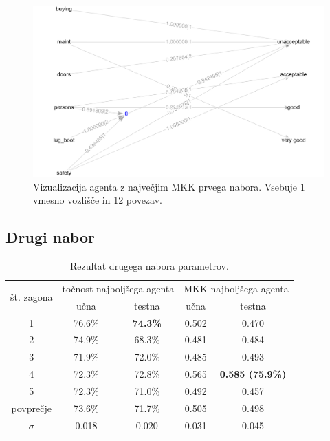 \begin{figure}[H]
    \begin{center}
        \includegraphics[width=13cm]{car/1/mcc_g}
    \end{center}
    \caption{Vizualizacija agenta z največjim MKK prvega nabora. Vsebuje 1 vmesno vozlišče in 12 povezav.}
    \label{fig:car_mcc_1_g}
\end{figure}

\subsection{Drugi nabor}\label{subsec:dodatek-car-drugi-nabor}
\begin{table}[H]
    \begin{center}
        \begin{tabular}{|| c | c c || c c ||}
            \hline
            \multirow{2}{*}{št. zagona} & \multicolumn{2}{c||}{točnost najboljšega agenta} & \multicolumn{2}{c||}{MKK najboljšega agenta} \\ \cline{2-5}
            & učna   & testna          & učna  & testna                  \\
            \hline
            1         & 76.6\% & \textbf{74.3\%} & 0.502 & 0.470                   \\
            \hline
            2         & 74.9\% & 68.3\%          & 0.481 & 0.484                   \\
            \hline
            3         & 71.9\% & 72.0\%          & 0.485 & 0.493                   \\
            \hline
            4         & 72.3\% & 72.8\%          & 0.565 & \textbf{0.585 (75.9\%)} \\
            \hline
            5         & 72.3\% & 71.0\%          & 0.492 & 0.457                   \\
            \hline
            povprečje & 73.6\% & 71.7\%          & 0.505 & 0.498                   \\
            \hline
            $\sigma$  & 0.018  & 0.020            & 0.031 & 0.045                   \\
            \hline
        \end{tabular}
    \end{center}
    \caption{Rezultat drugega nabora parametrov.}
    \label{tab:car_result_2}
\end{table}

